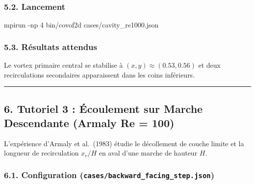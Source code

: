 \documentclass[
  french,
]{article}
\newenvironment{Shaded}{}{}
\newcommand{\AttributeTok}[1]{\textcolor[rgb]{0.49,0.56,0.16}{#1}}
\newcommand{\ExtensionTok}[1]{#1}
\newcommand{\NormalTok}[1]{#1}
\begin{document}
\subsubsection{5.2. Lancement}\label{lancement-1}

\begin{Shaded}
\begin{Highlighting}[]
\ExtensionTok{mpirun} \AttributeTok{{-}np}\NormalTok{ 4 bin/covof2d cases/cavity\_re1000.json}
\end{Highlighting}
\end{Shaded}

\subsubsection{5.3. Résultats attendus}\label{ruxe9sultats-attendus}

Le vortex primaire central se stabilise à
\((x, y) \approx (0.53, 0.56)\) et deux recirculations secondaires
apparaissent dans les coins inférieurs.

\begin{center}\rule{0.5\linewidth}{0.5pt}\end{center}

\subsection{6. Tutoriel 3 : Écoulement sur Marche Descendante (Armaly Re
=
100)}\label{tutoriel-3-uxe9coulement-sur-marche-descendante-armaly-re-100}

L'expérience d'Armaly et al.~(1983) étudie le décollement de couche
limite et la longueur de recirculation \(x_r / H\) en aval d'une marche
de hauteur \(H\).

\subsubsection{\texorpdfstring{6.1. Configuration
(\texttt{cases/backward\_facing\_step.json})}{6.1. Configuration (cases/backward\_facing\_step.json)}}\label{configuration-casesbackward_facing_step.json}
\end{document}
